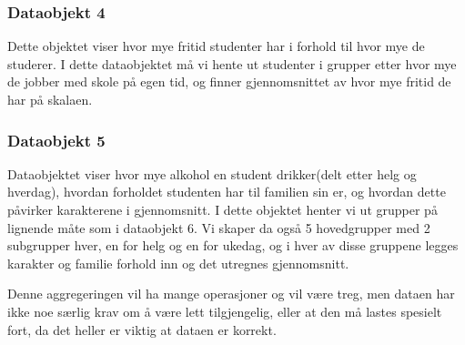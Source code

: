 \subsubsection{Dataobjekt 4}
Dette objektet viser hvor mye fritid studenter har i forhold til hvor mye de studerer. I dette dataobjektet må vi hente ut studenter i grupper etter hvor mye de jobber med skole på egen tid, og finner gjennomsnittet av hvor mye fritid de har på skalaen.

\subsubsection{Dataobjekt 5}
Dataobjektet viser hvor mye alkohol en student drikker(delt etter helg og hverdag), hvordan forholdet studenten har til familien sin er, og hvordan dette påvirker karakterene i gjennomsnitt. I dette objektet henter vi ut grupper på lignende måte som i dataobjekt 6. Vi skaper da også 5 hovedgrupper med 2 subgrupper hver, en for helg og en for ukedag, og i hver av disse gruppene legges karakter og familie forhold inn og det utregnes gjennomsnitt. 

Denne aggregeringen vil ha mange operasjoner og vil være treg, men dataen har ikke noe særlig krav om å være lett tilgjengelig, eller at den må lastes spesielt fort, da det heller er viktig at dataen er korrekt.

